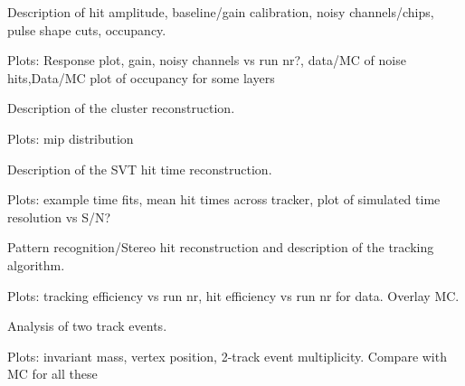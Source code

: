 

\vspace{1cm}{\bf Calibration [Omar]}


Description of hit amplitude, baseline/gain calibration, noisy channels/chips, pulse shape cuts, occupancy. 

Plots: Response plot, gain, noisy channels vs run nr?, data/MC of noise hits,Data/MC plot of occupancy for some layers  

\vspace{1cm}{\bf Cluster reconstruction [Omar]}


Description of the cluster reconstruction.

Plots: mip distribution

\vspace{1cm}{\bf SVT timing [Sho]}


Description of the SVT hit time reconstruction. 

Plots: example time fits, mean hit times across tracker, plot of simulated time resolution vs S/N? 

\vspace{1cm}{\bf Tracking algorithms [Matt/Omar]}


Pattern recognition/Stereo hit reconstruction and description of the tracking algorithm. 

 Plots: tracking efficiency vs run nr, hit efficiency vs run nr for data. Overlay MC.
 
\vspace{1cm}{\bf Tracking algorithms [Matt]}


Analysis of two track events. 

Plots: invariant mass, vertex position, 2-track event multiplicity. Compare with MC for all these 
